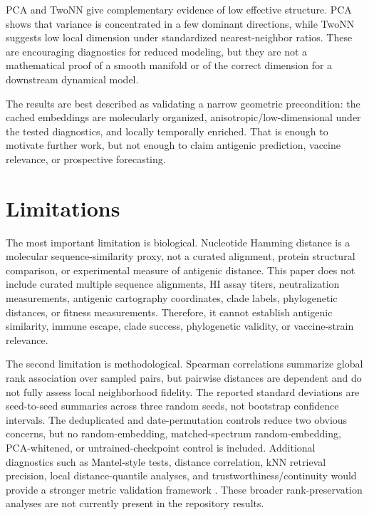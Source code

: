 \documentclass[11pt]{article}
\begin{document}
PCA and TwoNN give complementary evidence of low effective structure. PCA shows that variance is concentrated in a few dominant directions, while TwoNN suggests low local dimension under standardized nearest-neighbor ratios. These are encouraging diagnostics for reduced modeling, but they are not a mathematical proof of a smooth manifold or of the correct dimension for a downstream dynamical model.

The results are best described as validating a narrow geometric precondition: the cached embeddings are molecularly organized, anisotropic/low-dimensional under the tested diagnostics, and locally temporally enriched. That is enough to motivate further work, but not enough to claim antigenic prediction, vaccine relevance, or prospective forecasting.

\section{Limitations}

The most important limitation is biological. Nucleotide Hamming distance is a molecular sequence-similarity proxy, not a curated alignment, protein structural comparison, or experimental measure of antigenic distance. This paper does not include curated multiple sequence alignments, HI assay titers, neutralization measurements, antigenic cartography coordinates, clade labels, phylogenetic distances, or fitness measurements. Therefore, it cannot establish antigenic similarity, immune escape, clade success, phylogenetic validity, or vaccine-strain relevance.

The second limitation is methodological. Spearman correlations summarize global rank association over sampled pairs, but pairwise distances are dependent and do not fully assess local neighborhood fidelity. The reported standard deviations are seed-to-seed summaries across three random seeds, not bootstrap confidence intervals. The deduplicated and date-permutation controls reduce two obvious concerns, but no random-embedding, matched-spectrum random-embedding, PCA-whitened, or untrained-checkpoint control is included. Additional diagnostics such as Mantel-style tests, distance correlation, kNN retrieval precision, local distance-quantile analyses, and trustworthiness/continuity would provide a stronger metric validation framework \cite{mantel1967detection,szekely2007distance,lee2009quality}. These broader rank-preservation analyses are not currently present in the repository results.
\end{document}
